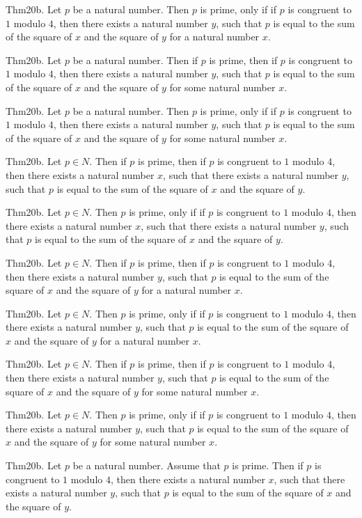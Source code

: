 \documentclass{article}
\begin{document}
Thm20b. Let $p$ be a natural number. Then $p$ is prime, only if if $p$ is congruent to $1$ modulo $4$, then there exists a natural number $y$, such that $p$ is equal to the sum of the square of $x$ and the square of $y$ for a natural number $x$.

Thm20b. Let $p$ be a natural number. Then if $p$ is prime, then if $p$ is congruent to $1$ modulo $4$, then there exists a natural number $y$, such that $p$ is equal to the sum of the square of $x$ and the square of $y$ for some natural number $x$.

Thm20b. Let $p$ be a natural number. Then $p$ is prime, only if if $p$ is congruent to $1$ modulo $4$, then there exists a natural number $y$, such that $p$ is equal to the sum of the square of $x$ and the square of $y$ for some natural number $x$.

Thm20b. Let $p \in N$. Then if $p$ is prime, then if $p$ is congruent to $1$ modulo $4$, then there exists a natural number $x$, such that there exists a natural number $y$, such that $p$ is equal to the sum of the square of $x$ and the square of $y$.

Thm20b. Let $p \in N$. Then $p$ is prime, only if if $p$ is congruent to $1$ modulo $4$, then there exists a natural number $x$, such that there exists a natural number $y$, such that $p$ is equal to the sum of the square of $x$ and the square of $y$.

Thm20b. Let $p \in N$. Then if $p$ is prime, then if $p$ is congruent to $1$ modulo $4$, then there exists a natural number $y$, such that $p$ is equal to the sum of the square of $x$ and the square of $y$ for a natural number $x$.

Thm20b. Let $p \in N$. Then $p$ is prime, only if if $p$ is congruent to $1$ modulo $4$, then there exists a natural number $y$, such that $p$ is equal to the sum of the square of $x$ and the square of $y$ for a natural number $x$.

Thm20b. Let $p \in N$. Then if $p$ is prime, then if $p$ is congruent to $1$ modulo $4$, then there exists a natural number $y$, such that $p$ is equal to the sum of the square of $x$ and the square of $y$ for some natural number $x$.

Thm20b. Let $p \in N$. Then $p$ is prime, only if if $p$ is congruent to $1$ modulo $4$, then there exists a natural number $y$, such that $p$ is equal to the sum of the square of $x$ and the square of $y$ for some natural number $x$.

Thm20b. Let $p$ be a natural number. Assume that $p$ is prime. Then if $p$ is congruent to $1$ modulo $4$, then there exists a natural number $x$, such that there exists a natural number $y$, such that $p$ is equal to the sum of the square of $x$ and the square of $y$.
\end{document}
